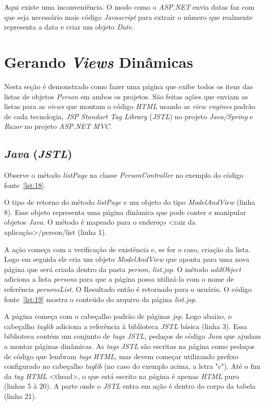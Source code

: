 Aqui existe uma inconveniência. O modo como o \textit{ASP.NET} envia datas faz com que seja necessário mais código \textit{Javascript} para extrair o número que realmente representa a data e criar um objeto \textit{Date}.

\section{Gerando \textit{Views} Dinâmicas}

Nesta seção é demonstrado como fazer uma página que exibe todos os itens das listas de objetos \textit{Person} em ambos os projetos. São feitas ações que enviam as listas para as \textit{views} que montam o código \textit{HTML} usando as \textit{view engines} padrão de cada tecnologia, \textit{JSP Standart Tag Library} (\textit{JSTL}) no projeto \textit{Java/Spring} e \textit{Razor} no projeto \textit{ASP.NET MVC}.

\subsection{\textit{Java} (\textit{JSTL})}

Observe o método \textit{listPage} na classe \textit{PersonController} no exemplo do código fonte~\ref{lst:18}.


O tipo de retorno do método \textit{listPage} e um objeto do tipo \textit{ModelAndView} (linha 8). Esse objeto representa uma página dinâmica que pode conter e manipular objetos \textit{Java}. O método é mapeado para o endereço <raiz da aplicação>/person/list (linha 1). 

A ação começa com a verificação de existência e, se for o caso, criação da lista. Logo em seguida ele cria um objeto \textit{ModelAndView} que aponta para uma nova página que será criada dentro da pasta \textit{person}, \textit{list.jsp}. O método \textit{addObject} adiciona a lista \textit{persons} para que a página possa utilizá-la com o nome de referência \textit{personsList}. O Resultado então é retornado para o usuário. O código fonte~\ref{lst:19} mostra o conteúdo do arquivo da página \textit{list.jsp}.


A página começa com o cabeçalho padrão de páginas \textit{jsp}. Logo abaixo, o cabeçalho \textit{taglib} adiciona a referência à biblioteca \textit{JSTL} básica (linha 3). Essa biblioteca contém um conjunto de \textit{tags} \textit{JSTL}, pedaços de código \textit{Java} que ajudam a montar páginas dinâmicas. As \textit{tags} \textit{JSTL} são escritas na página como pedaços de código que lembram \textit{tags} \textit{HTML}, mas devem começar utilizando prefixo configurado no cabeçalho \textit{taglib} (no caso do exemplo acima, a letra "c"). Até o fim da \textit{tag} \textit{HTML} <thead>, o que está escrito na página é apenas \textit{HTML} puro (linhas 5 à 20). A parte onde o \textit{JSTL} entra em ação é dentro do corpo da tabela (linha 21). 

